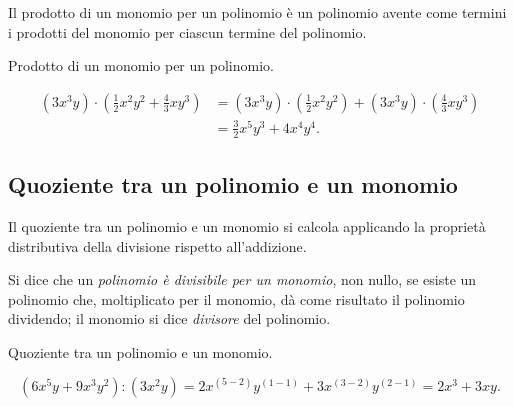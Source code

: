 \osservazione Il prodotto di un monomio per un polinomio è
un polinomio avente come termini i prodotti del monomio per ciascun
termine del polinomio.

\begin{exrig}
 \begin{esempio}
 Prodotto di un monomio per un polinomio.

 \begin{equation*}
\begin{split}
\left(3x^{3}y\right)\cdot\left(\frac{1}{2}x^{2}y^{2}+\frac{4}{3}{xy}^{3}
\right)&=\left(3x^{3}y\right)\cdot\left(\frac{1}{2}x^{2}y^{2}
\right)+\left(3x^{3}y\right)\cdot%
\left(\frac{4}{3}{xy}^{3}\right)\\
&=\frac{3}{2}x^{5}y^{3}+4x^{4}y^{4}.
\end{split}
\end{equation*}
 \end{esempio}
\end{exrig}


\subsection{Quoziente tra un polinomio e un monomio}
\label{subsec:10_poli_quozientepermonomio}

Il quoziente tra un polinomio e un monomio si calcola applicando la
proprietà distributiva della divisione rispetto
all'addizione.

\begin{definizione}
 Si dice che un \emph{polinomio è divisibile per un monomio}, non
nullo, se esiste un polinomio che, moltiplicato per il monomio, dà
come risultato il polinomio dividendo; il monomio si dice
\emph{divisore} del polinomio.
\end{definizione}

\begin{exrig}
 \begin{esempio}
 Quoziente tra un polinomio e un monomio.
 
\[\left(6x^{5}y+9x^{3}y^{2}\right):\left(3x^{2}y\right)=2x^{(5-2)}y^{(1-1)}
+3x^{(3-2)}y^{(2-1)}=2x^{3}+3{xy}.\]
 \end{esempio}
\end{exrig}
\osservazione

